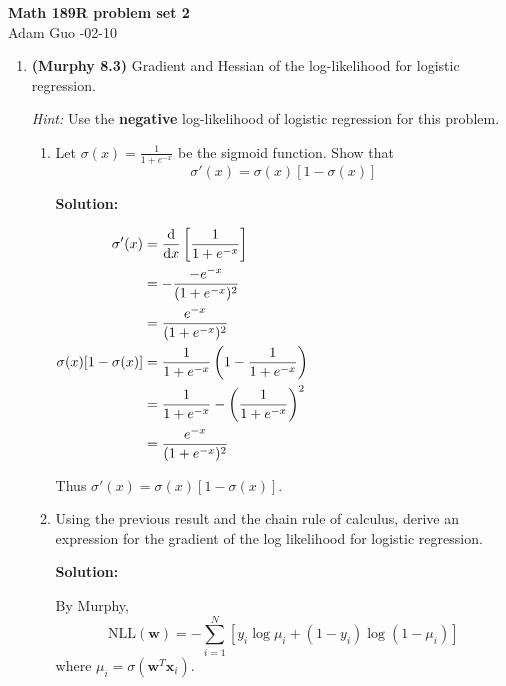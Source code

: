 \documentclass[letter,11pt]{article}
\newenvironment{solution}{
    \vspace{0.16in} {\bf Solution:}
    
}{
	\vspace{0.16in}
}
\begin{document}
\begin{center}
    {\bf \Large Math 189R problem set 2} \\
    \vspace{0.1in}
    Adam Guo -02-10
\end{center}

\begin{enumerate}
    \item \textbf{(Murphy 8.3)} Gradient and Hessian of the log-likelihood for logistic regression.

    \textit{Hint:} Use the \textbf{negative} log-likelihood of logistic regression for this problem.

    \begin{enumerate}
        \item Let $\sigma(x) = \frac{1}{1 + e^{-x}}$ be the sigmoid function. Show that \[\sigma'(x) = \sigma(x) [1 - \sigma(x)]\]

        \begin{solution}
            $\begin{aligned}
                \sigma'(x) &= \dv{x} \left[ \frac{1}{1 + e^{-x}} \right] \\
                    &= -\frac{-e^{-x}}{(1 + e^{-x})^2} \\
                    &= \frac{e^{-x}}{(1 + e^{-x})^2} \\
                \sigma(x) [1 - \sigma(x)] &= \frac{1}{1 + e^{-x}} \left( 1 - \frac{1}{1 + e^{-x}} \right) \\
                    &= \frac{1}{1 + e^{-x}} - \left( \frac{1}{1 + e^{-x}} \right)^2 \\
                    &= \frac{e^{-x}}{(1 + e^{-x})^2}
            \end{aligned}$

            Thus $\sigma'(x) = \sigma(x) [1 - \sigma(x)]$.
        \end{solution}

        \item Using the previous result and the chain rule of calculus, derive an expression for the gradient of the log likelihood for logistic regression.

        \begin{solution}
            By Murphy, \[\text{NLL}(\textbf{w}) = -\sum_{i=1}^N [y_i \log \mu_i + (1 - y_i) \log (1 - \mu_i)]\] where $\mu_i = \sigma(\textbf{w}^T \textbf{x}_i)$.


\end{solution}
\end{enumerate}
\end{enumerate}
\end{document}

